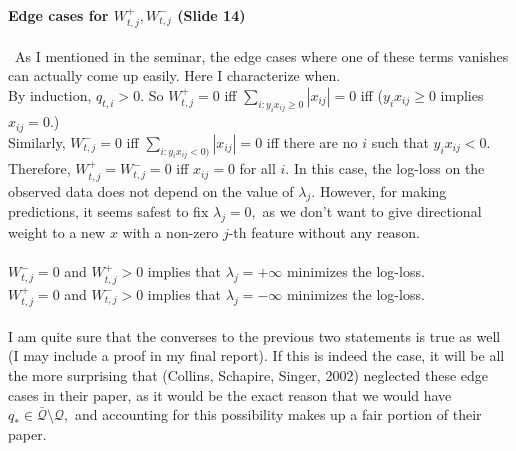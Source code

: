 \documentclass[a4paper,12pt]{article}
\begin{document}
\paragraph{Edge cases for $W^+_{t,j}, W^-_{t,j}$ (Slide 14)}\
As I mentioned in the seminar, the edge cases where one of these terms vanishes can actually come up easily. Here I characterize when. 
\\
By induction, $q_{t,i}>0.$ So $W^+_{t,j} = 0$ iff $\sum_{i: y_i x_{ij} \geq 0} |x_{ij}| = 0$ iff ($y_i x_{ij} \geq 0 $ implies $x_{ij}=0.$) \
\\
Similarly, $W^-_{t,j} = 0 $ iff $\sum_{i: y_i x_{ij} < 0)} |x_{ij}| = 0 $ iff there are no $i$ such that $y_i x_{ij}<0.$ 
\\
Therefore, $W^+_{t,j} = W^-_{t,j} = 0$ iff $x_{ij}=0$ for all $i.$ In this case, the log-loss on the observed data does not depend on the value of $\lambda_j.$ However, for making predictions, it seems safest to fix $\lambda_j = 0,$ as we don't want to give directional weight to a new $x$ with a non-zero $j$-th feature without any reason. \
\\
\\
$W^-_{t,j}=0$ and $W^+_{t,j}>0$ implies that $\lambda_j = +\infty$ minimizes the log-loss.\\
$W^+_{t,j}=0$ and $W^-_{t,j}>0$ implies that $\lambda_j = -\infty$ minimizes the log-loss.\\
\\
I am quite sure that the converses to the previous two statements is true as well (I may include a proof in my final report). If this is indeed the case, it will be all the more surprising that (Collins, Schapire, Singer, 2002) neglected these edge cases in their paper, as it would be the exact reason that we would have $q_*\in \bar{\mathcal{Q}}\setminus \mathcal{Q},$ and accounting for this possibility makes up a fair portion of their paper. 
\end{document}
